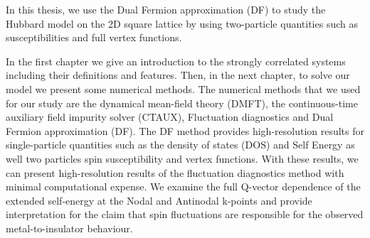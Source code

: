 \documentclass[12pt]{pdfathesis}
\begin{document}
\begin{prefatory}
\frontpage
\abstract%
In this thesis, we use the Dual Fermion approximation (DF) to study the Hubbard model on the 2D square lattice by using two-particle quantities such as susceptibilities and full vertex functions. 

In the first chapter we give an introduction to the strongly correlated systems including their definitions and features. Then, in the next chapter, to solve our model we present some numerical methods.  The numerical methods that we used for our study are the dynamical mean-field theory  (DMFT), the continuous-time auxiliary field impurity solver (CTAUX), Fluctuation diagnostics and Dual Fermion approximation (DF). The DF method provides high-resolution results for single-particle quantities such as the density of states (DOS) and Self Energy as well two particles spin susceptibility and vertex functions. With these results, we can present high-resolution results of the fluctuation diagnostics method with minimal computational expense. We examine the full Q-vector dependence of the extended self-energy at the Nodal and Antinodal k-points and provide interpretation for the claim that spin fluctuations are responsible for the observed metal-to-insulator behaviour. 







\end{prefatory}
\end{document}
